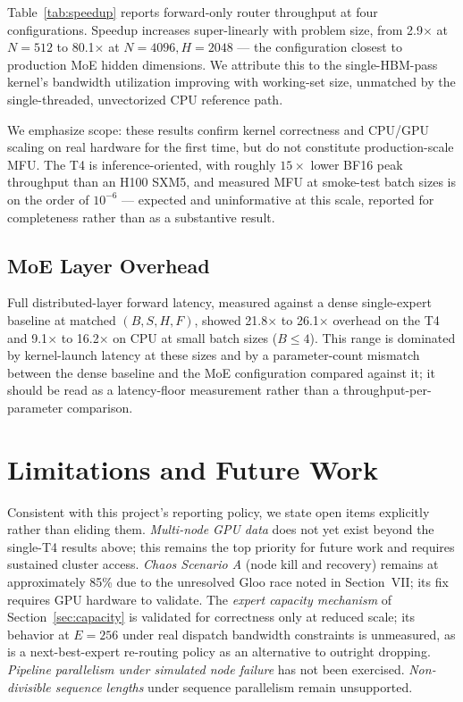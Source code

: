 \documentclass[conference]{IEEEtran}
\begin{document}
Table~\ref{tab:speedup} reports forward-only router throughput at four
configurations. Speedup increases super-linearly with problem size, from
2.9$\times$ at $N{=}512$ to 80.1$\times$ at $N{=}4096, H{=}2048$ --- the
configuration closest to production MoE hidden dimensions. We attribute
this to the single-HBM-pass kernel's bandwidth utilization improving with
working-set size, unmatched by the single-threaded, unvectorized CPU
reference path.

We emphasize scope: these results confirm kernel correctness and
CPU/GPU scaling on real hardware for the first time, but do not constitute
production-scale MFU. The T4 is inference-oriented, with roughly
$15\times$ lower BF16 peak throughput than an H100 SXM5, and measured MFU
at smoke-test batch sizes is on the order of $10^{-6}$ --- expected and
uninformative at this scale, reported for completeness rather than as a
substantive result.

\subsection{MoE Layer Overhead}

Full distributed-layer forward latency, measured against a dense
single-expert baseline at matched $(B,S,H,F)$, showed 21.8$\times$ to
26.1$\times$ overhead on the T4 and 9.1$\times$ to 16.2$\times$ on CPU at
small batch sizes ($B{\le}4$). This range is dominated by kernel-launch
latency at these sizes and by a parameter-count mismatch between the
dense baseline and the MoE configuration compared against it; it should
be read as a latency-floor measurement rather than a throughput-per-parameter
comparison.

\section{Limitations and Future Work}
\label{sec:limitations}

Consistent with this project's reporting policy, we state open items
explicitly rather than eliding them. \emph{Multi-node GPU data} does not
yet exist beyond the single-T4 results above; this remains the top
priority for future work and requires sustained cluster access.
\emph{Chaos Scenario A} (node kill and recovery) remains at approximately
85\% due to the unresolved Gloo race noted in Section~VII; its fix
requires GPU hardware to validate. The \emph{expert capacity mechanism} of
Section~\ref{sec:capacity} is validated for correctness only at reduced
scale; its behavior at $E{=}256$ under real dispatch bandwidth constraints
is unmeasured, as is a next-best-expert re-routing policy as an
alternative to outright dropping. \emph{Pipeline parallelism under
simulated node failure} has not been exercised. \emph{Non-divisible
sequence lengths} under sequence parallelism remain unsupported.
\end{document}
